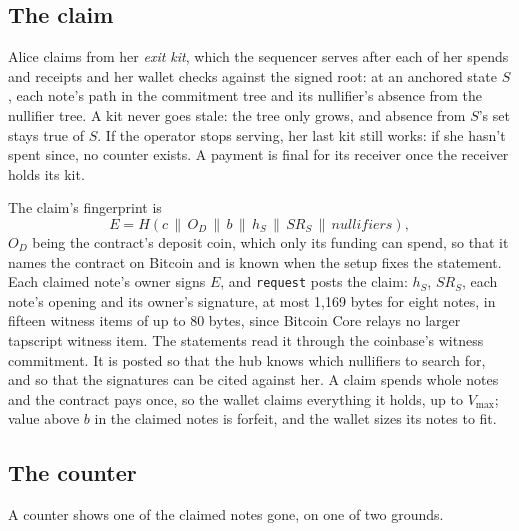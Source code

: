 \documentclass[11pt]{article}
\newcommand{\vmax}{V_{\max}}
\newcommand{\tx}[1]{\texttt{#1}}
\begin{document}
\subsection{The claim}

Alice claims from her \emph{exit kit}, which the sequencer serves after
each of her spends and receipts and her wallet checks against the signed
root: at an anchored state $S$, each note's path in the commitment tree
and its nullifier's absence from the nullifier tree. A kit never goes
stale: the tree only grows, and absence from $S$'s set stays true of
$S$. If the operator stops serving, her last kit still works: if she
hasn't spent since, no counter exists. A payment is final for its
receiver once the receiver holds its kit.

The claim's fingerprint is
\[
  E = H(c \,\|\, O_D \,\|\, b \,\|\, h_S \,\|\, \mathit{SR}_S \,\|\, \mathit{nullifiers}),
\]
$O_D$ being the contract's deposit coin, which only its funding can
spend, so that it names the contract on Bitcoin and is known when the
setup fixes the statement. Each claimed note's owner signs $E$, and
\tx{request} posts the claim: $h_S$, $\mathit{SR}_S$, each note's opening
and its owner's signature, at most 1,169 bytes for eight notes, in
fifteen witness items of up to 80 bytes, since Bitcoin Core relays no
larger tapscript witness item. The statements read it through the
coinbase's witness commitment. It is posted so that the hub knows which
nullifiers to search for, and so that the signatures can be cited
against her. A claim spends whole notes and the contract pays once, so
the wallet claims everything it holds, up to $\vmax$; value above $b$
in the claimed notes is forfeit, and the wallet sizes its notes to fit.

\subsection{The counter}

A counter shows one of the claimed notes gone, on one of two grounds.
\end{document}
